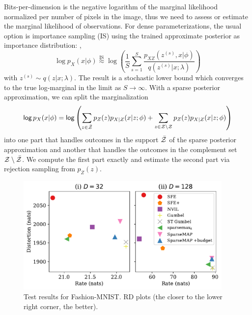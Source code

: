 Bits-per-dimension is the negative logarithm of the marginal likelihood
normalized per number of pixels in the image, thus we need to assess
or estimate the marginal likelihood of observations. For dense
parameterizations, the usual option is importance sampling (IS) using
the trained approximate posterior as importance distribution: \ie,
%
\begin{equation}
    \log p_X(x|\phi) \overset{\text{IS}}{\approx}
    \log \left(\frac{1}{S}\sum_{s=1}^S \frac{p_{XZ}(z^{(s)}, x|\phi)}{q(z^{(s)} | x; \lambda)}\right)
\end{equation}
%
with $z^{(s)} \sim q(z|x; \lambda)$. The result is a
stochastic lower bound which converges to the true log-marginal in
the limit as $S \to \infty$. With a sparse posterior approximation, we
can split the marginalization
%
\begin{equation}
    \operatorname*{\mathsf{log}} p_X(x|\phi) = \operatorname*{\mathsf{log}} \left( \sum_{z \in \bar {\mathcal{Z}}}
    p_Z(z)p_{X|Z}(x|z; \phi) + \sum_{z \in \mathcal{Z} \setminus \mathcal{Z}} p_Z(z)p_{X|Z}(x|z; \phi)
    \right)
\end{equation}
%
into one part that handles outcomes in the support $\bar {\mathcal{Z}}$ of the
sparse posterior approximation and another that handles the
outcomes in the complement set $\mathcal{Z} \setminus \bar {\mathcal{Z}}$. We compute
the first part exactly and estimate the second part via rejection
sampling from $p_Z(z)$.

\begin{figure}[t]
    \centering
    \includegraphics[width=0.95\textwidth]{Figures/distortion-rate.pdf}
    \caption[Test results for Fashion-MNIST.]{\label{fig:distortion_rd}Test results for Fashion-MNIST. RD plots
        (the closer to the lower right corner, the better).}
\end{figure}

